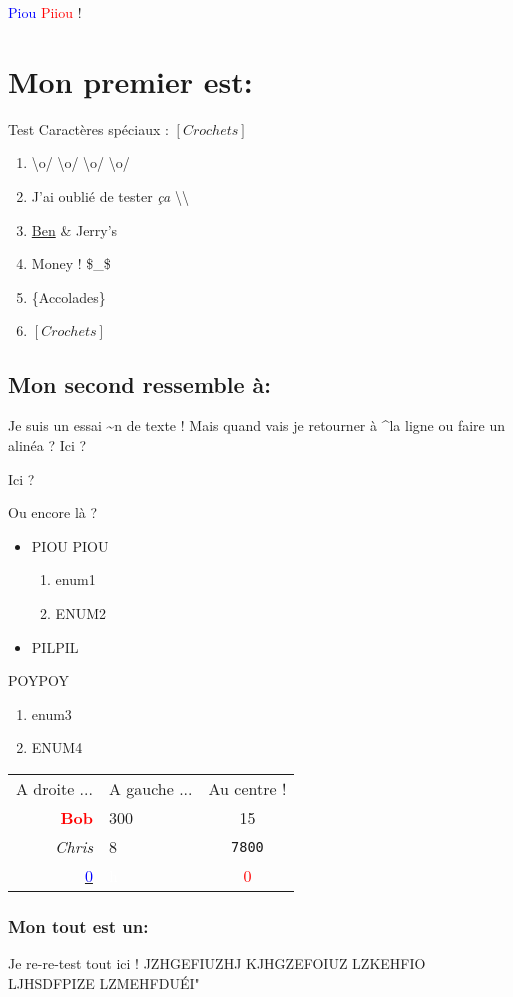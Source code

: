 \documentclass[10pt,a4paper]{report}
\begin{document}
\textcolor{blue}{Piou} \textcolor{red}{Piiou} !

\section{Mon premier est:}        

Test Caractères spéciaux :
$\left[ Crochets \right]$

\begin{enumerate}
\item \textbackslash o/ \textbackslash o/ \textbackslash o/ \textbackslash o/
\item J'ai oublié de tester \textit{ça} \textbackslash\textbackslash
\item \underline{Ben} \& Jerry's
\item Money ! \$\_\$
\item \{Accolades\}
\item $\left[ Crochets \right]$
\end{enumerate}

\subsection{Mon second ressemble à:}


Je suis un essai \textasciitilde n de texte ! Mais quand vais je retourner à \textasciicircum la ligne ou faire un alinéa ?
Ici ?

Ici ?


Ou encore là ?

\begin{itemize}
\item PIOU PIOU
\begin{enumerate}
\item enum1
\item ENUM2
\end{enumerate}
\item PILPIL
\end{itemize}
POYPOY
\begin{enumerate}
\item enum3
\item ENUM4
\end{enumerate}
\begin{tabular}{rlc}
A droite ... & A gauche ... & Au centre ! \\
{\bf \textcolor{red}{Bob}} & 300 & 15 \\
{\itshape Chris} & 8 & \texttt{7800} \\
\underline{ \textcolor{blue}{0}} & \textcolor{white}{h} & \textcolor{red}{0} \\
\end{tabular}

\subsubsection{Mon tout est un:}
Je re-re-test tout ici !
JZHGEFIUZHJ
KJHGZEFOIUZ
LZKEHFIO
LJHSDFPIZE
LZMEHFDUÉI"
\end{document}
